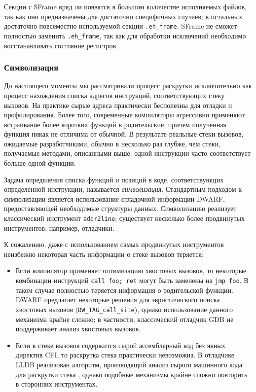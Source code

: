 Секции с SFrame вряд ли появятся в большом количестве исполняемых файлов, так как они предназначены для достаточно
специфичных случаев; в остальных достаточно повсеместно используемой секции \lstinline!.eh_frame!.
SFrame не сможет полностью заменить \lstinline!.eh_frame!, так как для обработки исключений необходимо восстанавливать состояние регистров.

\subsubsection{Символизация}
До настоящего моменты мы рассматривали процесс раскрутки исключительно как процесс нахождения списка адресов инструкций,
соответствующих стеку вызовов.
На практике сырые адреса практически бесполезны для отладки и профилирования.
Более того, современные компиляторы агрессивно применяют встраивание более коротких функций в родительские, причем полученная функция
никак не отличима от обычной. В результате реальные стеки вызовов, ожидаемые разработчиками, обычно в несколько раз глубже, чем стеки,
получаемые методами, описанными выше: одной инструкции часто соответствует больше одной функции.

Задача определения списка функций и позиций в коде, соответствующих определенной инструкции, называется \textit{символизация}.
Стандартным подходом к символизации является использование отладочной информации DWARF, предоставляющей необходимые структуры данных.
Символизацию реализует классический инструмент \verb!addr2line!; существует несколько более продвинутых инструментов,
например, отладчики.

К сожалению, даже с использованием самых продвинутых инструментов неизбежно некоторая часть информации о стеке вызовов теряется:
\begin{itemize}
    \item
    Если компилятор применяет оптимизацию хвостовых вызовов,
    то некоторые комбинации инструкций \verb!call foo; ret! могут быть заменены на \verb!jmp foo!.
    В таком случае полностью теряется информация о родительской функции.
    DWARF предлагает некоторые решения для эвристического поиска хвостовых вызовов (\verb!DW_TAG_call_site!), однако использование данного
    механизма крайне сложно; в частности, классический отладчик GDB не поддерживает анализ хвостовых вызовов.

    \item
    Если в стеке вызовов содержится сырой ассемблерный код без явных директив CFI, то раскрутка стека практически невозможна.
    В отладчике LLDB реализован алгоритм, производящий анализ сырого машинного кода для раскрутки стека \cite{lldb:asmcfi}, однако
    подобные механизмы крайне сложно повторить в сторонних инструментах.
\end{itemize}

